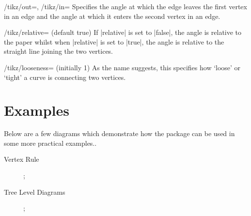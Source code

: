 \documentclass[a4paper,final]{ltxdoc}
\begin{document}
\begin{codeexample}[execute code=false]
\begin{keylist}{%
  /tikz/out=,
  /tikz/in=}
  Specifies the angle at which the edge leaves the first vertex in an edge and
  the angle at which it enters the second vertex in an edge.
\end{keylist}

\begin{key}{/tikz/relative= (default true)}
  If |relative| is set to |false|, the angle is relative to the paper whilst when
  |relative| is set to |true|, the angle is relative to the straight line
  joining the two vertices.
\end{key}

\begin{key}{/tikz/looseness= (initially 1)}
  As the name suggests, this specifies how `loose' or `tight' a curve is
  connecting two vertices.
\end{key}

\clearpage
\section{Examples}
\label{sec:examples}

Below are a few diagrams which demonstrate how the package can be used in some
more practical examples..

\begin{description}
\item[Vertex Rule] \hspace*{0pt} \newline
\begin{codeexample}[]
;
\end{codeexample}

\item[Tree Level Diagrams] \hspace*{0pt} \newline
\begin{codeexample}[]
;
\end{codeexample}


\end{description}
\end{codeexample}
\end{document}
